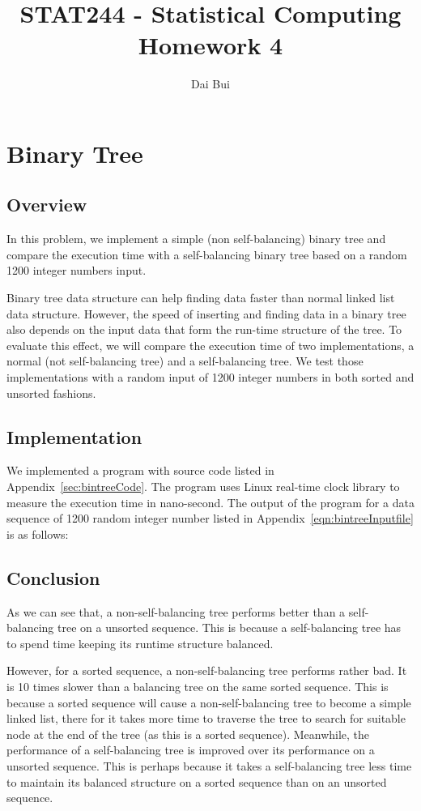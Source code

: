 \documentclass{article}
\title{STAT244 - Statistical Computing\\Homework 4}
\author{Dai Bui}
\begin{document}
\date{}
\maketitle
\section{Binary Tree}
\subsection{Overview}
In this problem, we implement a simple (non self-balancing) binary tree and
compare the execution time with a self-balancing binary tree based on a random
1200 integer numbers input.

Binary tree data structure can help finding data faster than normal linked list
data structure. However, the speed of inserting and finding data in a binary
tree also depends on the input data that form the run-time structure of the
tree. To evaluate this effect, we will compare the execution time of two
implementations, a normal (not self-balancing tree) and a self-balancing tree.
We test those implementations with a random input of 1200 integer numbers in
both sorted and unsorted fashions.


\subsection{Implementation}
We implemented a program with source code listed in
Appendix~\ref{sec:bintreeCode}. The program uses Linux real-time clock library
to measure the execution time in nano-second. The output of the
program for a data sequence of 1200 random integer number listed in
Appendix~\ref{eqn:bintreeInputfile} is as follows:

\subsection{Conclusion}
As we can see that, a non-self-balancing tree performs better than
a self-balancing tree  on a unsorted sequence. This is because a self-balancing
tree has to spend time keeping its runtime structure balanced.

However, for a sorted sequence, a non-self-balancing tree performs rather bad.
It is 10 times slower than a balancing tree on the same sorted sequence. This
is because a sorted sequence will cause a non-self-balancing tree to become a
simple linked list, there for it takes more time to traverse the tree to search
for suitable node at the end of the tree (as this is a sorted sequence).
Meanwhile, the performance of a self-balancing tree is improved over its
performance on a unsorted sequence. This is perhaps because it takes a
self-balancing tree less time to maintain its balanced structure on a sorted
sequence than on an unsorted sequence.
\end{document}
